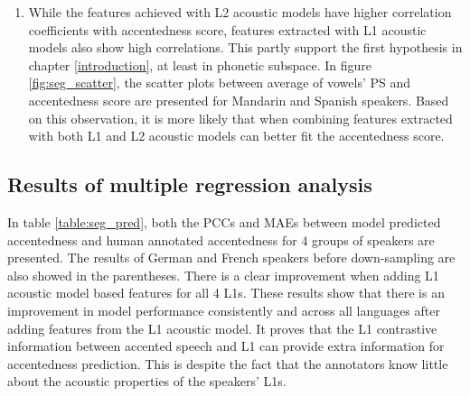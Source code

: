 \begin{enumerate}
 \item While the features achieved with L2 acoustic models have higher correlation coefficients with accentedness score, features extracted with L1 acoustic models also show high correlations. This partly support the first hypothesis in chapter \ref{introduction}, at least in phonetic subspace. In figure \ref{fig:seg_scatter}, the scatter plots between average of vowels' PS and accentedness score are presented for Mandarin and Spanish speakers. Based on this observation, it is more likely that when combining features extracted with both L1 and L2 acoustic models can better fit the accentedness score.
\end{enumerate}

\subsection{Results of multiple regression analysis}

In table \ref{table:seg_pred}, both the PCCs and MAEs between model predicted accentedness and human annotated accentedness for 4 groups of speakers are presented. The results of German and French speakers before down-sampling are also showed in the parentheses. There is a clear improvement when adding L1 acoustic model based features for all 4 L1s. These results show that there is an improvement in model performance consistently and across all languages after adding features from the L1 acoustic model. It proves that the L1 contrastive information between accented speech and L1 can provide extra information for accentedness prediction. This is despite the fact that the annotators know little about the acoustic properties of the speakers' L1s.

